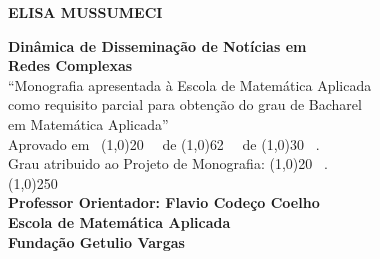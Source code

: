 \documentclass[a4paper,12pt]{article}
\begin{document}
\begin{titlepage}
 \begin{center}
 
  {\bf \large ELISA MUSSUMECI}\\[0.3cm]

  \vspace{25 mm}

  {\bf \large Dinâmica de Disseminação de Notícias em}\\[0.1cm]
  {\bf \large Redes Complexas}\\[4cm]

  {“Monografia apresentada à Escola de Matemática Aplicada}\\[0.1cm]
  {como requisito parcial para obtenção do grau de Bacharel }\\[0.1cm]
  {em Matemática Aplicada”}\\[6cm]


  {Aprovado em \ \line(1,0){20} \ \ de \line(1,0){62} \ \ de \line(1,0){30} \ .}\\[0.1cm]
  {Grau atribuido ao Projeto de Monografia: \line(1,0){20} \ . }\\[3cm]
  
  
  {\line(1,0){250}}\\
  {\bf Professor Orientador: Flavio Codeço Coelho}\\[0.1cm]
  {\bf Escola de Matemática Aplicada}\\[0.1cm]
  {\bf Fundação Getulio Vargas}
 \end{center}
\end{titlepage}

\newpage\null\thispagestyle{empty}\newpage

\tableofcontents

\pagebreak

\begin{abstract}
 
O processo de formação de opinião é fortemente influenciado pela mídia digital.
Entretanto pouco se sabe sobre o processo de disseminação de notícias e os fatores que determinam o alcance de cada
notícia.

A disseminação de uma notícia se dá por meio de um ou mais caminhos em uma rede desconhecida de influência entre 
formadores de opinião (produtores de notícias). Este padrão pode ser recuperado, com algum grau de incerteza, a partir de dados
da sequência temporal das publicações sobre um mesmo tema, e dos links nelas contidos.

Este projeto tem como objetivo caracterizar as redes de interligação de veículos de mídia e modelar a dinâmica do espalhamento 
de notícias, a fim de prever tendências e mapear questões de interesse.

\end{abstract}
\end{document}
